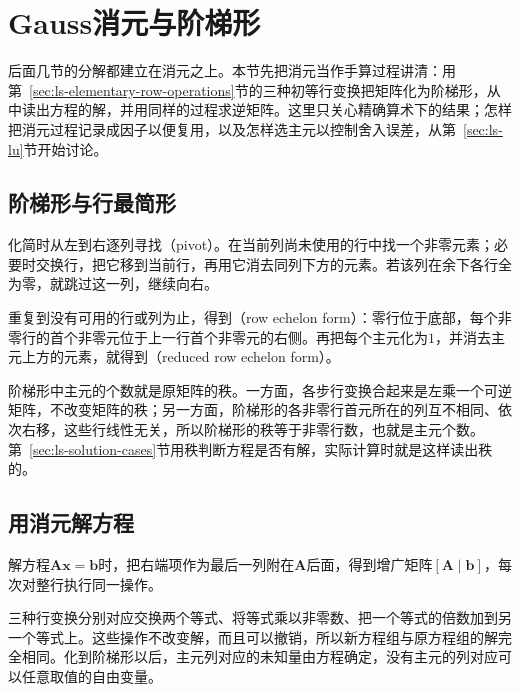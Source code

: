 \section{Gauss消元与阶梯形}
\label{sec:ls-gaussian-elimination}

后面几节的分解都建立在消元之上。本节先把消元当作手算过程讲清：用第~\ref{sec:ls-elementary-row-operations}节的三种初等行变换把矩阵化为阶梯形，从中读出方程的解，并用同样的过程求逆矩阵。这里只关心精确算术下的结果；怎样把消元过程记录成因子以便复用，以及怎样选主元以控制舍入误差，从第~\ref{sec:ls-lu}节开始讨论。

\subsection{阶梯形与行最简形}
化简时从左到右逐列寻找（pivot）。在当前列尚未使用的行中找一个非零元素；必要时交换行，把它移到当前行，再用它消去同列下方的元素。若该列在余下各行全为零，就跳过这一列，继续向右。

重复到没有可用的行或列为止，得到（row echelon form）：零行位于底部，每个非零行的首个非零元位于上一行首个非零元的右侧。再把每个主元化为$1$，并消去主元上方的元素，就得到（reduced row echelon form）。

阶梯形中主元的个数就是原矩阵的秩。一方面，各步行变换合起来是左乘一个可逆矩阵，不改变矩阵的秩；另一方面，阶梯形的各非零行首元所在的列互不相同、依次右移，这些行线性无关，所以阶梯形的秩等于非零行数，也就是主元个数。第~\ref{sec:ls-solution-cases}节用秩判断方程是否有解，实际计算时就是这样读出秩的。

\subsection{用消元解方程}
解方程$\bm A\bm x=\bm b$时，把右端项作为最后一列附在$\bm A$后面，得到增广矩阵$[\bm A\mid\bm b]$，每次对整行执行同一操作。

三种行变换分别对应交换两个等式、将等式乘以非零数、把一个等式的倍数加到另一个等式上。这些操作不改变解，而且可以撤销，所以新方程组与原方程组的解完全相同。化到阶梯形以后，主元列对应的未知量由方程确定，没有主元的列对应可以任意取值的自由变量。

